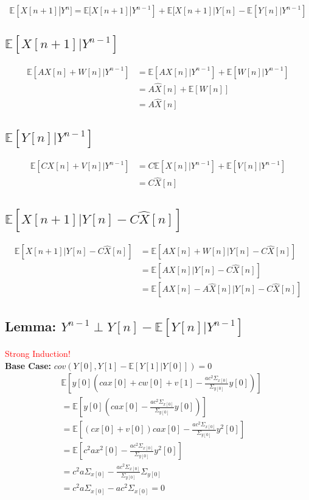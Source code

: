 \documentclass[leqno,twocolumn]{article}
\begin{document}
\[ \mathbb{E}[X[n+1]|Y^n] = \mathbb{E}[X[n+1]|Y^{n-1}]+\mathbb{E}[X[n+1]|Y[n]-\mathbb{E}[Y[n]|Y^{n-1}] \]

\setcounter{equation}{0}
\subsection{$\mathbb{E}[X[n+1]|Y^{n-1}]$}
\begin{align}
\mathbb{E}[AX[n] + W[n]|Y^{n-1}] &= \mathbb{E}[AX[n]|Y^{n-1}] + \mathbb{E}[W[n]|Y^{n-1}]\\
&= A\hat{X}[n] + \mathbb{E}[W[n]]\\
&= A\hat{X}[n]
\end{align}

\subsection{$\mathbb{E}[Y[n]|Y^{n-1}]$}
\begin{align}
\mathbb{E}[CX[n]+V[n]|Y^{n-1}] &= C\mathbb{E}[X[n]|Y^{n-1}] + \mathbb{E}[V[n]|Y^{n-1}]\\
&= C\hat{X}[n]
\end{align}

\subsection{$\mathbb{E}[X[n+1]|Y[n]-C\hat{X}[n]]$}
\begin{align}
\mathbb{E}[X[n+1]|Y[n]-C\hat{X}[n]] &= \mathbb{E}[AX[n]+W[n]|Y[n]-C\hat{X}[n]]\\
&= \mathbb{E}[AX[n]|Y[n]-C\hat{X}[n]]\\
&= \mathbb{E}[AX[n]-A\hat{X}[n]|Y[n]-C\hat{X}[n]]
\end{align}

\subsection*{Lemma: $Y^{n-1} \perp Y[n]-\mathbb{E}[Y[n]|Y^{n-1}]$}
{\Large \textcolor{red}{Strong Induction!}}\\
\textbf{Base Case:} $cov(Y[0],Y[1]-\mathbb{E}[Y[1]|Y[0]])=0$
\setcounter{equation}{0}
\begin{align}
&\mathbb{E}[y[0](cax[0]+cw[0]+v[1]-\frac{ac^2\Sigma_{x[0]}}{\Sigma_{y[0]}}y[0])]\\
&= \mathbb{E}[y[0](cax[0]-\frac{ac^2\Sigma_{x[0]}}{\Sigma_{y[0]}}y[0])]\\
&= \mathbb{E}[(cx[0]+v[0])cax[0]-\frac{ac^2\Sigma_{x[0]}}{\Sigma_{y[0]}}y^2[0]]\\
&= \mathbb{E}[c^2ax^2[0]-\frac{ac^2\Sigma_{x[0]}}{\Sigma_{y[0]}}y^2[0]]\\
&= c^2a\Sigma_{x[0]} - \frac{ac^2\Sigma_{x[0]}}{\Sigma_{y[0]}}\Sigma_{y[0]}\\
&= c^2a\Sigma_{x[0]} - ac^2\Sigma_{x[0]} = 0
\end{align}
\end{document}
